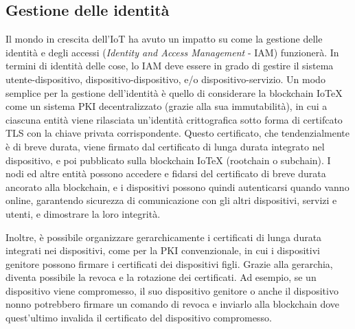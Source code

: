 \subsection{Gestione delle identità}
Il mondo in crescita dell'IoT ha avuto un impatto su come la gestione delle identità e degli accessi (\emph{Identity and Access Management} - IAM) funzionerà. In termini di identità delle cose, lo IAM deve essere in grado di gestire il sistema utente-dispositivo, dispositivo-dispositivo, e/o dispositivo-servizio. Un modo semplice per la gestione dell'identità è quello di considerare la blockchain IoTeX come un sistema PKI decentralizzato (grazie alla sua immutabilità), in cui a ciascuna entità viene rilasciata un'identità crittografica sotto forma di certifcato TLS con la chiave privata corrispondente. Questo certificato, che tendenzialmente è di breve durata, viene firmato dal certificato di lunga durata integrato nel dispositivo, e poi pubblicato sulla blockchain IoTeX (rootchain o subchain). I nodi ed altre entità possono accedere e fidarsi del certificato di breve durata ancorato alla
blockchain, e i dispositivi possono quindi autenticarsi quando vanno online, garantendo sicurezza di comunicazione con gli altri dispositivi, servizi e utenti, e dimostrare la loro integrità.

Inoltre, è possibile organizzare gerarchicamente i certificati di lunga durata integrati nei dispositivi, come per la PKI convenzionale, in cui i dispositivi genitore possono firmare i certificati dei dispositivi figli. Grazie alla gerarchia, diventa possibile la revoca e la rotazione dei certificati. Ad esempio, se un dispositivo viene compromesso, il suo dispositivo genitore o anche il dispositivo nonno potrebbero firmare un comando di revoca e inviarlo alla blockchain dove quest'ultimo invalida il certificato del dispositivo compromesso.